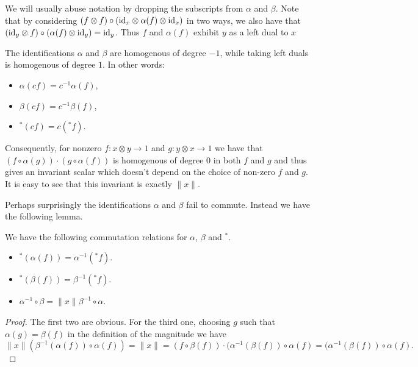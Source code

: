 \documentclass{amsart}
\begin{document}
We will usually abuse notation by dropping the subscripts from $\alpha$ and $\beta$.  Note that by considering $(f \otimes f) \circ (\mathrm{id}_x \otimes \alpha(f) \otimes \mathrm{id}_x)$ in two ways, we also have that $(\mathrm{id}_y \otimes f) \circ (\alpha(f) \otimes \mathrm{id}_y) = \mathrm{id}_y$.  Thus $f$ and $\alpha(f)$ exhibit $y$ as a left dual to $x$

\begin{lemma}
The identifications $\alpha$ and $\beta$ are homogenous of degree $-1$, while taking left duals is homogenous of degree $1$.  In other words:
\begin{itemize}
\item $\alpha(cf) = c^{-1} \alpha(f)$,
\item $\beta(cf) = c^{-1} \beta(f)$,
\item ${}^*(cf) = c ({}^*f)$.
\end{itemize}
\end{lemma}

Consequently, for nonzero $f: x \otimes y \rightarrow 1$ and $g: y \otimes x \rightarrow 1$ we have that $(f \circ \alpha(g)) \cdot (g \circ \alpha(f))$ is homogenous of degree $0$ in both $f$ and $g$ and thus gives an invariant scalar which doesn't depend on the choice of non-zero $f$ and $g$.  It is easy to see that this invariant is exactly $\lVert x \rVert$.

\begin{warning}
Perhaps surprisingly the identifications $\alpha$ and $\beta$ fail to commute.  Instead we have the following lemma.
\end{warning}

\begin{lemma}
We have the following commutation relations for $\alpha$, $\beta$ and ${}^*$.

\begin{itemize}
\item ${}^*(\alpha(f)) = \alpha^{-1}({}^*f)$.
\item ${}^*(\beta(f)) = \beta^{-1}({}^*f)$.
\item $\alpha^{-1} \circ \beta = \lVert x \rVert \beta^{-1} \circ \alpha$.
\end{itemize}
\end{lemma}
\begin{proof}
The first two are obvious.  For the third one, choosing $g$ such that $\alpha(g) = \beta(f)$ in the definition of the magnitude we have 
$$ \lVert x \rVert (\beta^{-1}(\alpha(f)) \circ \alpha(f)) = \lVert x \rVert = (f \circ \beta(f)) \cdot (\alpha^{-1}(\beta(f)) \circ \alpha(f) = (\alpha^{-1}(\beta(f)) \circ \alpha(f).$$
\end{proof}
\end{document}
